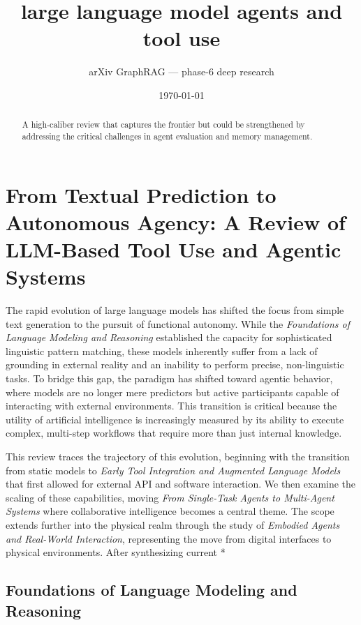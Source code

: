 \documentclass[11pt]{article}
\title{large language model agents and tool use}
\author{arXiv GraphRAG --- phase-6 deep research}
\date{\today}
\begin{document}
\maketitle

\begin{abstract}
A high-caliber review that captures the frontier but could be strengthened by addressing the critical challenges in agent evaluation and memory management.
\end{abstract}

\section{From Textual Prediction to Autonomous Agency: A Review of LLM-Based Tool Use and Agentic Systems}

The rapid evolution of large language models has shifted the focus from simple text generation to the pursuit of functional autonomy. While the \textit{Foundations of Language Modeling and Reasoning} established the capacity for sophisticated linguistic pattern matching, these models inherently suffer from a lack of grounding in external reality and an inability to perform precise, non-linguistic tasks. To bridge this gap, the paradigm has shifted toward agentic behavior, where models are no longer mere predictors but active participants capable of interacting with external environments. This transition is critical because the utility of artificial intelligence is increasingly measured by its ability to execute complex, multi-step workflows that require more than just internal knowledge.

This review traces the trajectory of this evolution, beginning with the transition from static models to \textit{Early Tool Integration and Augmented Language Models} that first allowed for external API and software interaction. We then examine the scaling of these capabilities, moving \textit{From Single-Task Agents to Multi-Agent Systems} where collaborative intelligence becomes a central theme. The scope extends further into the physical realm through the study of \textit{Embodied Agents and Real-World Interaction}, representing the move from digital interfaces to physical environments. After synthesizing current *

\subsection{Foundations of Language Modeling and Reasoning}
\end{document}
